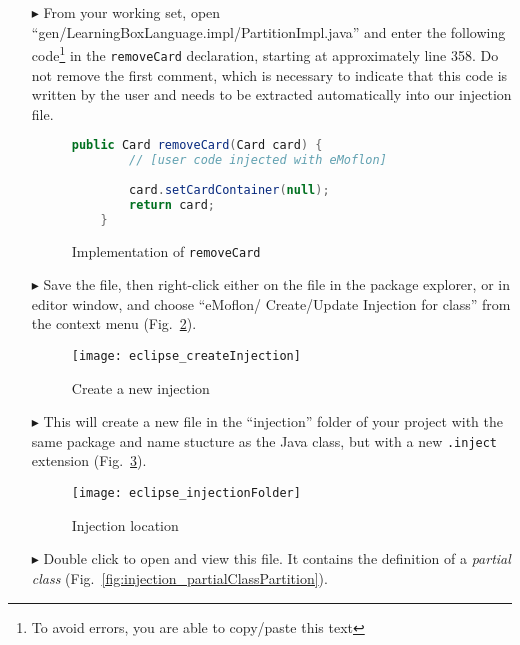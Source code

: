 \begin{itemize}


\item[$\blacktriangleright$] From your working set, open ``gen/LearningBoxLanguage.impl/Part\-it\-ionImpl.java'' and enter the following code\footnote{To avoid
errors, you are able to copy/paste this text} in the \texttt{removeCard} declaration, starting at approximately line 358. Do not remove the first comment,
which is necessary to indicate that this code is written by the user and needs to be extracted automatically into our injection file.

\begin{figure}[htbp]
        \centering
        \begin{lstlisting}[language=Java, keywordstyle={\bfseries\color{purple}}, backgroundcolor=\color{white}]
    public Card removeCard(Card card) {
        // [user code injected with eMoflon]
        
        card.setCardContainer(null);
        return card;
    }
        \end{lstlisting}
        \caption{Implementation of \texttt{removeCard}}
        \label{fig:addToStringRep_impl}
\end{figure}

\item[$\blacktriangleright$] Save the file, then right-click either on the file in the package explorer, or in editor window, and choose ``eMoflon/
Create/Update Injection for class'' from the context menu (Fig.~\ref{fig:injection_create_injection}).

\begin{figure}[htbp]
    \centering
    \texttt{[image: eclipse\_createInjection]}
    \caption{Create a new injection}
    \label{fig:injection_create_injection}
\end{figure}
    
\item[$\blacktriangleright$] This will create a new file in the ``injection'' folder of your project with the same package and name stucture as the Java class,
but with a new \texttt{.inject} extension (Fig.~\ref{fig:injection_folder}).

\begin{figure}[htbp]
    \centering
    \texttt{[image: eclipse\_injectionFolder]}
    \caption{Injection location}
    \label{fig:injection_folder}
\end{figure}

\item[$\blacktriangleright$] Double click to open and view this file. It contains the definition of a \textit{partial class}
(Fig.~\ref{fig:injection_partialClassPartition}).


\end{itemize}
